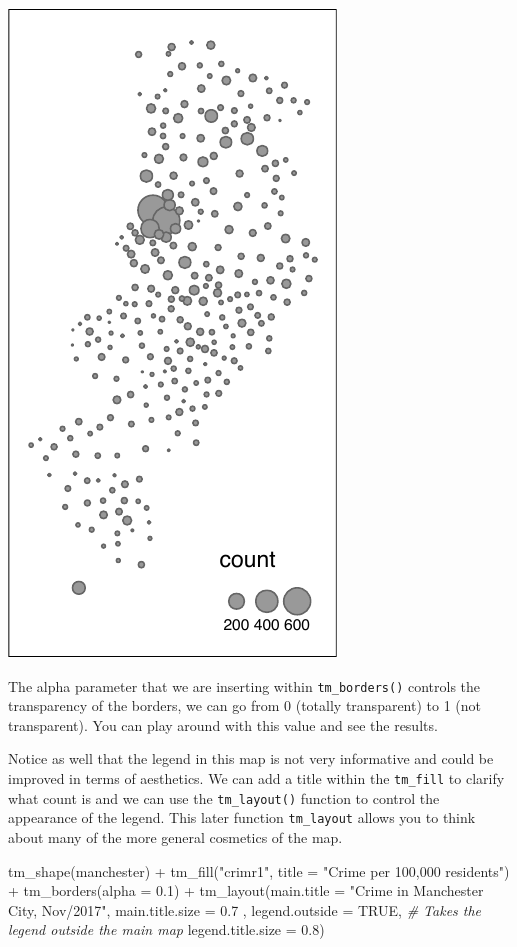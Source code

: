 \documentclass[
]{book}
\newenvironment{Shaded}{\begin{snugshade}}{\end{snugshade}}
\newcommand{\AttributeTok}[1]{\textcolor[rgb]{0.77,0.63,0.00}{#1}}
\newcommand{\CommentTok}[1]{\textcolor[rgb]{0.56,0.35,0.01}{\textit{#1}}}
\newcommand{\ConstantTok}[1]{\textcolor[rgb]{0.00,0.00,0.00}{#1}}
\newcommand{\FloatTok}[1]{\textcolor[rgb]{0.00,0.00,0.81}{#1}}
\newcommand{\FunctionTok}[1]{\textcolor[rgb]{0.00,0.00,0.00}{#1}}
\newcommand{\NormalTok}[1]{#1}
\newcommand{\SpecialCharTok}[1]{\textcolor[rgb]{0.00,0.00,0.00}{#1}}
\newcommand{\StringTok}[1]{\textcolor[rgb]{0.31,0.60,0.02}{#1}}
\begin{document}
\includegraphics{crime_mapping_files/figure-latex/unnamed-chunk-78-1.pdf}

The alpha parameter that we are inserting within \texttt{tm\_borders()} controls the transparency of the borders, we can go from 0 (totally transparent) to 1 (not transparent). You can play around with this value and see the results.

Notice as well that the legend in this map is not very informative and could be improved in terms of aesthetics. We can add a title within the \texttt{tm\_fill} to clarify what count is and we can use the \texttt{tm\_layout()} function to control the appearance of the legend. This later function \texttt{tm\_layout} allows you to think about many of the more general cosmetics of the map.

\begin{Shaded}
\begin{Highlighting}[]
\FunctionTok{tm\_shape}\NormalTok{(manchester) }\SpecialCharTok{+} 
  \FunctionTok{tm\_fill}\NormalTok{(}\StringTok{"crimr1"}\NormalTok{, }\AttributeTok{title =} \StringTok{"Crime per 100,000 residents"}\NormalTok{) }\SpecialCharTok{+}
  \FunctionTok{tm\_borders}\NormalTok{(}\AttributeTok{alpha =} \FloatTok{0.1}\NormalTok{) }\SpecialCharTok{+}
  \FunctionTok{tm\_layout}\NormalTok{(}\AttributeTok{main.title =} \StringTok{"Crime in Manchester City, Nov/2017"}\NormalTok{, }
            \AttributeTok{main.title.size =} \FloatTok{0.7}\NormalTok{ ,}
            \AttributeTok{legend.outside =} \ConstantTok{TRUE}\NormalTok{,  }\CommentTok{\# Takes the legend outside the main map }
            \AttributeTok{legend.title.size =} \FloatTok{0.8}\NormalTok{)}
\end{Highlighting}
\end{Shaded}
\end{document}
